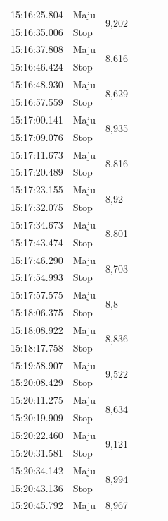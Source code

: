 \begin{longtable}{|l|l|l|l|l|l|}
  \hline
  15:16:25.804 & Maju & \multirow{2}{*}{9,202} \\
  \cline{1-2}
  15:16:35.006 & Stop & \\
  \hline
  15:16:37.808 & Maju & \multirow{2}{*}{8,616} \\
  \cline{1-2}
  15:16:46.424 & Stop & \\
  \hline
  15:16:48.930 & Maju & \multirow{2}{*}{8,629} \\
  \cline{1-2}
  15:16:57.559 & Stop & \\
  \hline
  15:17:00.141 & Maju & \multirow{2}{*}{8,935} \\
  \cline{1-2}
  15:17:09.076 & Stop & \\
  \hline
  15:17:11.673 & Maju & \multirow{2}{*}{8,816} \\
  \cline{1-2}
  15:17:20.489 & Stop & \\
  \hline
  15:17:23.155 & Maju & \multirow{2}{*}{8,92} \\
  \cline{1-2}
  15:17:32.075 & Stop & \\
  \hline
  15:17:34.673 & Maju & \multirow{2}{*}{8,801} \\
  \cline{1-2}
  15:17:43.474 & Stop & \\
  \hline
  15:17:46.290 & Maju & \multirow{2}{*}{8,703} \\
  \cline{1-2}
  15:17:54.993 & Stop & \\
  \hline
  15:17:57.575 & Maju & \multirow{2}{*}{8,8} \\
  \cline{1-2}
  15:18:06.375 & Stop & \\
  \hline
  15:18:08.922 & Maju & \multirow{2}{*}{8,836} \\
  \cline{1-2}
  15:18:17.758 & Stop & \\
  \hline
  15:19:58.907 & Maju & \multirow{2}{*}{9,522} \\
  \cline{1-2}
  15:20:08.429 & Stop & \\
  \hline
  15:20:11.275 & Maju & \multirow{2}{*}{8,634} \\
  \cline{1-2}
  15:20:19.909 & Stop & \\
  \hline
  15:20:22.460 & Maju & \multirow{2}{*}{9,121} \\
  \cline{1-2}
  15:20:31.581 & Stop & \\
  \hline
  15:20:34.142 & Maju & \multirow{2}{*}{8,994} \\
  \cline{1-2}
  15:20:43.136 & Stop & \\
  \hline
  15:20:45.792 & Maju & \multirow{2}{*}{8,967} \\

\end{longtable}
